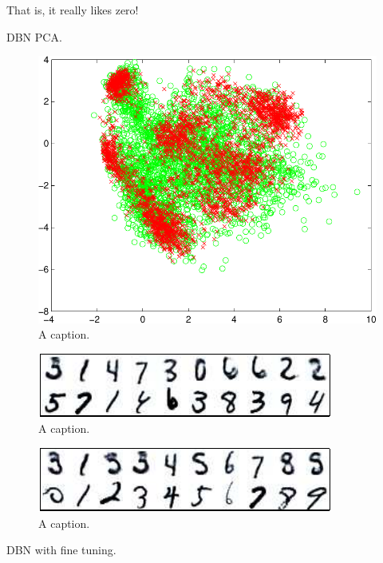 \documentclass{article}
\begin{document}
That is, it really likes zero!

DBN PCA.

\begin{figure}[ht]
\centering
\includegraphics[width=0.98\columnwidth]{figures/dbn_pca}
\caption{
A caption.
}
\label{fig:dbn_pca}
\end{figure}

\begin{figure}[ht]
\centering
\includegraphics[width=0.98\columnwidth]{figures/dbn_witness_peaks}
\caption{
A caption.
}
\label{fig:dbn_witness_peaks}
\end{figure}

\begin{figure}[ht]
\centering
\includegraphics[width=0.98\columnwidth]{figures/dbn_cond}
\caption{
A caption.
}
\label{fig:dbn_cond}
\end{figure}

DBN with fine tuning.
\end{document}
